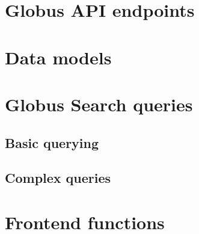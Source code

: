\documentclass{report}
\begin{document}
\chapter{Globus API endpoints\label{appendix:globusapis}}


\chapter{Data models}


\chapter{Globus Search queries}
\section{Basic querying}
\section{Complex queries}

\chapter{Frontend functions}

\end{document}
